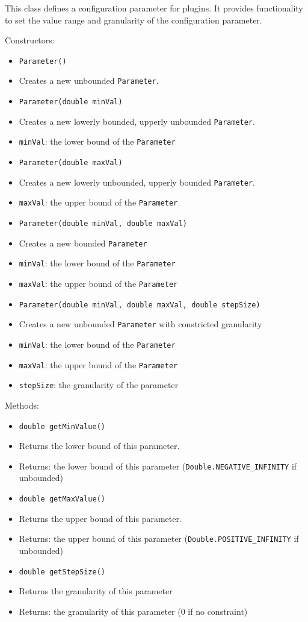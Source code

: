 \documentclass[parskip=full,11pt]{scrartcl}
\begin{document}
This class defines a configuration parameter for plugins. It provides functionality to set the value range and granularity of the configuration parameter.

Constructors:
\begin{itemize}\itemsep -10pt
	\item \texttt{Parameter()}
	\item[] Creates a new unbounded \texttt{Parameter}.
	
	\item \texttt{Parameter(double minVal)}
	\item[] Creates a new lowerly bounded, upperly unbounded \texttt{Parameter}.
	\item[] \texttt{minVal}: the lower bound of the \texttt{Parameter}
	\item \texttt{Parameter(double maxVal)}
	\item[] Creates a new lowerly unbounded, upperly bounded \texttt{Parameter}.
	\item[] \texttt{maxVal}: the upper bound of the \texttt{Parameter}
	\item \texttt{Parameter(double minVal, double maxVal)}
	\item[] Creates a new bounded \texttt{Parameter}
	\item[] \texttt{minVal}: the lower bound of the \texttt{Parameter}
	\item[] \texttt{maxVal}: the upper bound of the \texttt{Parameter}
	\item \texttt{Parameter(double minVal, double maxVal, double stepSize)}
	\item[] Creates a new unbounded \texttt{Parameter} with constricted granularity
\item[] \texttt{minVal}: the lower bound of the \texttt{Parameter}
	\item[] \texttt{maxVal}: the upper bound of the \texttt{Parameter}
	\item[] \texttt{stepSize}: the granularity of the parameter
	
\end{itemize}

Methods:

\begin{itemize}\itemsep -10pt
	\item \texttt{double getMinValue()}
	\item[] Returns the lower bound of this parameter.
	\item[] Returns: the lower bound of this parameter (\texttt{Double.NEGATIVE\_INFINITY} if unbounded)
	\item \texttt{double getMaxValue()}
	\item[] Returns the upper bound of this parameter.
	\item[] Returns: the upper bound of this parameter (\texttt{Double.POSITIVE\_INFINITY} if unbounded)
	\item \texttt{double getStepSize()}
	\item[] Returns the granularity of this parameter
	\item[]Returns: the granularity of this parameter (\(0\) if no constraint)
\end{itemize}
\end{document}
